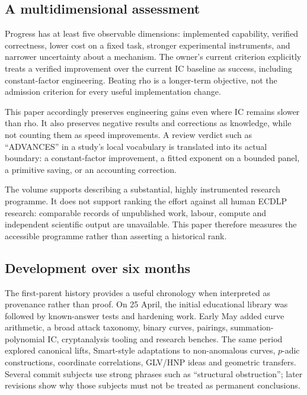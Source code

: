 \subsection{A multidimensional assessment}

Progress has at least five observable dimensions: implemented capability,
verified correctness, lower cost on a fixed task, stronger experimental
instruments, and narrower uncertainty about a mechanism. The owner's
current criterion explicitly treats a verified improvement over the
current IC baseline as success, including constant-factor engineering.
Beating rho is a longer-term objective, not the admission criterion for
every useful implementation change.

This paper accordingly preserves engineering gains even where IC remains
slower than rho. It also preserves negative results and corrections as
knowledge, while not counting them as speed improvements. A review verdict
such as ``ADVANCES'' in a study's local vocabulary is translated into its
actual boundary: a constant-factor improvement, a fitted exponent on a
bounded panel, a primitive saving, or an accounting correction.

The volume supports describing a substantial, highly instrumented
research programme. It does not support ranking the effort against all
human ECDLP research: comparable records of unpublished work, labour,
compute and independent scientific output are unavailable. This paper
therefore measures the accessible programme rather than asserting a
historical rank.

\subsection{Development over six months}

The first-parent history provides a useful chronology when interpreted as
provenance rather than proof. On 25 April, the initial educational library
was followed by known-answer tests and hardening work. Early May added
curve arithmetic, a broad attack taxonomy, binary curves, pairings,
summation-polynomial IC, cryptanalysis tooling and research benches. The
same period explored canonical lifts, Smart-style adaptations to
non-anomalous curves, $p$-adic constructions, coordinate correlations,
GLV/HNP ideas and geometric transfers. Several commit subjects use strong
phrases such as ``structural obstruction''; later revisions show why
those subjects must not be treated as permanent conclusions.

